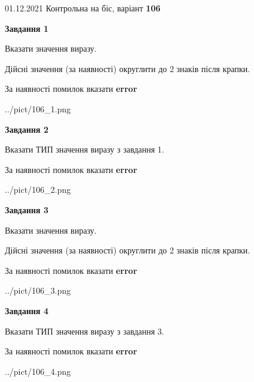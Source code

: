 \documentclass[11pt, ukrainian]{article}
\begin{document}
{01.12.2021 Контрольна на біс, варіант  \No \textbf { 106 }\par}
{
\begin {large}
{\begin {center}\textbf{Завдання 1}\end {center}}\par
Вказати значення виразу. \par
Дійсні значення (за наявності) округлити до 2 знаків після крапки. \par
За наявності помилок вказати \textbf{error}

\begin{center}
	{../pict/106_1.png}
\end{center}
\newpage

{\begin {center}\textbf{Завдання 2}\end {center}}\par
Вказати ТИП значення виразу з завдання 1. \par
За наявності помилок вказати \textbf{error}

\begin{center}
	{../pict/106_2.png}
\end{center}
\newpage

{\begin {center}\textbf{Завдання 3}\end {center}}\par
Вказати значення виразу. \par
Дійсні значення (за наявності) округлити до 2 знаків після крапки. \par
За наявності помилок вказати \textbf{error}

\begin{center}
	{../pict/106_3.png}
\end{center}
\newpage

{\begin {center}\textbf{Завдання 4}\end {center}}\par
Вказати ТИП значення виразу з завдання 3. \par
За наявності помилок вказати \textbf{error}

\begin{center}
	{../pict/106_4.png}
\end{center}
\newpage


\end{large}}
\end{document}
